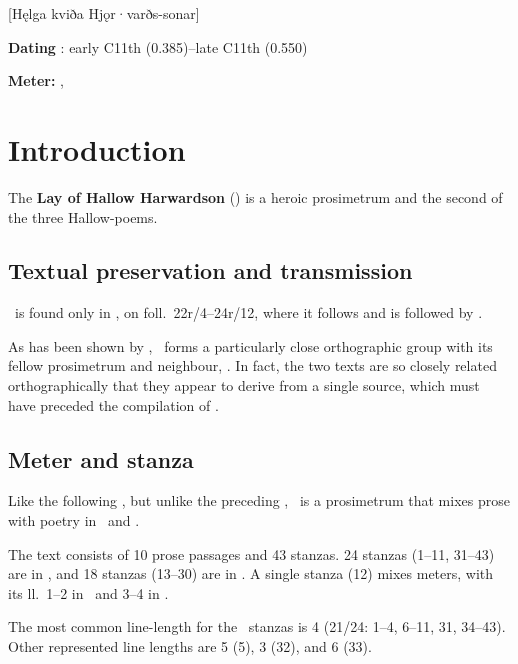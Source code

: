 [Hęlga kviða Hjǫr·varðs-sonar]

\begin{flushright}%
\textbf{Dating} \parencite{Sapp2022}: early C11th (0.385)--late C11th (0.550)

\textbf{Meter:} \Fornyrdislag, \Ljodahattr%
\end{flushright}%

\section{Introduction}

The \textbf{Lay of Hallow Harwardson} (\HelgakvidaHjorvardssonar) is a heroic prosimetrum and the second of the three Hallow-poems.

\subsection{Textual preservation and transmission}

\HelgakvidaHjorvardssonar\ is found only in \Regius, on foll.~22r/4--24r/12, where it follows  and is followed by .

As has been shown by \textcite[151--153]{Lindblad1980}, \HelgakvidaHjorvardssonar\ forms a particularly close orthographic group with its fellow prosimetrum and neighbour, .  In fact, the two texts are so closely related orthographically that they appear to derive from a single source, which must have preceded the compilation of \Regius.

\subsection{Meter and stanza}

Like the following , but unlike the preceding , \HelgakvidaHjorvardssonar\ is a prosimetrum that mixes prose with poetry in \Fornyrdislag\ and \Ljodahattr.

The text consists of 10 prose passages and 43 stanzas.
24 stanzas (1--11, 31--43) are in \Fornyrdislag, and 18 stanzas (13--30) are in \Ljodahattr.  A single stanza (12) mixes meters, with its ll.~1--2 in \Fornyrdislag\ and 3--4 in \Ljodahattr.

The most common line-length for the \Fornyrdislag\ stanzas is 4 (21/24: 1--4, 6--11, 31, 34--43).  Other represented line lengths are 5 (5), 3 (32), and 6 (33).

